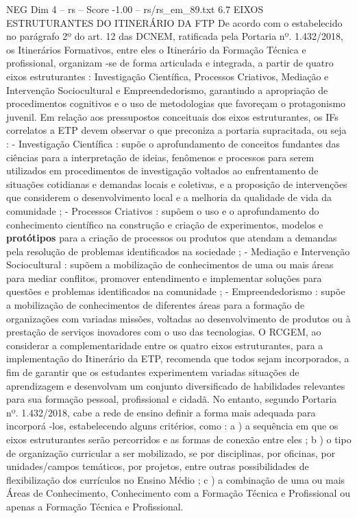 \begin{textsample}{NEG Dim 4 – rs – Score -1.00 – rs/rs\_em\_89.txt}  \label{ex:f4_neg_198}
6.7 EIXOS ESTRUTURANTES DO ITINERÁRIO DA FTP De acordo com o estabelecido no parágrafo 2º do art. 12 das DCNEM, ratificada pela Portaria nº. 1.432/2018, os Itinerários Formativos, entre eles o Itinerário da Formação Técnica e profissional, organizam -se de forma articulada e integrada, a partir de quatro eixos estruturantes : Investigação Científica, Processos Criativos, Mediação e Intervenção Sociocultural e Empreendedorismo, garantindo a apropriação de procedimentos cognitivos e o uso de metodologias que favoreçam o protagonismo juvenil.
Em relação aos pressupostos conceituais dos eixos estruturantes, os IFs correlatos a ETP devem observar o que preconiza a portaria supracitada, ou seja : - Investigação Científica : supõe o aprofundamento de conceitos fundantes das ciências para a interpretação de ideias, fenômenos e processos para serem utilizados em procedimentos de investigação voltados ao enfrentamento de situações cotidianas e demandas locais e coletivas, e a proposição de intervenções que considerem o desenvolvimento local e a melhoria da qualidade de vida da comunidade ; - Processos Criativos : supõem o uso e o aprofundamento do conhecimento científico na construção e criação de experimentos, modelos e \textbf{protótipos} para a criação de processos ou produtos que atendam a demandas pela resolução de problemas identificados na sociedade ; - Mediação e Intervenção Sociocultural : supõem a mobilização de conhecimentos de uma ou mais áreas para mediar conflitos, promover entendimento e implementar soluções para questões e problemas identificados na comunidade ; - Empreendedorismo : supõe a mobilização de conhecimentos de diferentes áreas para a formação de organizações com variadas missões, voltadas ao desenvolvimento de produtos ou à prestação de serviços inovadores com o uso das tecnologias.
O RCGEM, ao considerar a complementaridade entre os quatro eixos estruturantes, para a implementação do Itinerário da ETP, recomenda que todos sejam incorporados, a fim de garantir que os estudantes experimentem variadas situações de aprendizagem e desenvolvam um conjunto diversificado de habilidades relevantes para sua formação pessoal, profissional e cidadã.
No entanto, segundo Portaria nº. 1.432/2018, cabe a rede de ensino definir a forma mais adequada para incorporá -los, estabelecendo alguns critérios, como : a ) a sequência em que os eixos estruturantes serão percorridos e as formas de conexão entre eles ; b ) o tipo de organização curricular a ser mobilizado, se por disciplinas, por oficinas, por unidades/campos temáticos, por projetos, entre outras possibilidades de flexibilização dos currículos no Ensino Médio ; c ) a combinação de uma ou mais Áreas de Conhecimento, Conhecimento com a Formação Técnica e Profissional ou apenas a Formação Técnica e Profissional.

\end{textsample}
